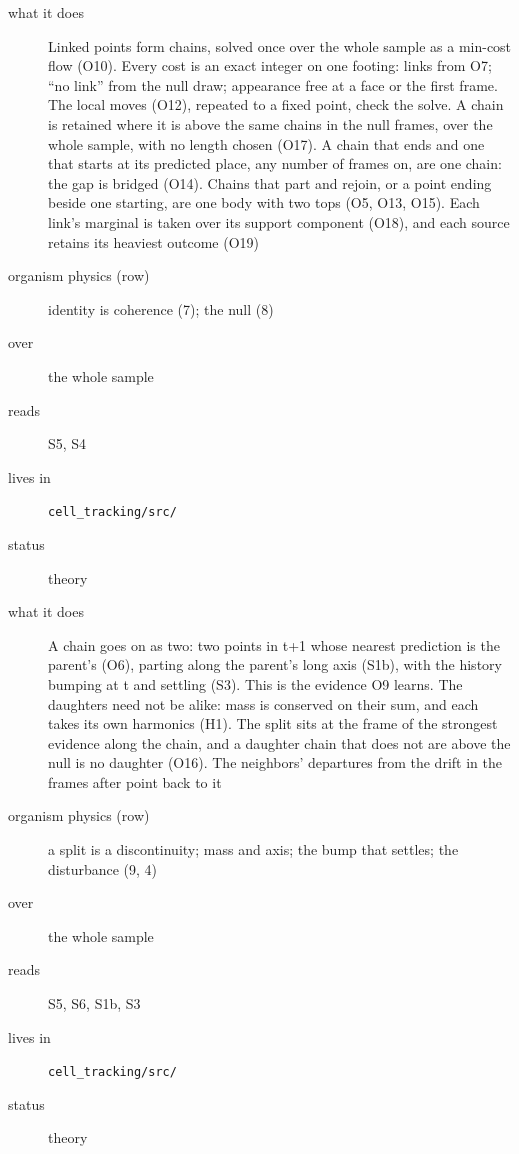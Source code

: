 \begin{description}
\item[{what it does}] Linked points form chains, solved once over the whole sample as a min-cost flow (O10). Every cost is an exact integer on one footing: links from O7; “no link” from the null draw; appearance free at a face or the first frame. The local moves (O12), repeated to a fixed point, check the solve. A chain is retained where it is above the same chains in the null frames, over the whole sample, with no length chosen (O17). A chain that ends and one that starts at its predicted place, any number of frames on, are one chain: the gap is bridged (O14). Chains that part and rejoin, or a point ending beside one starting, are one body with two tops (O5, O13, O15). Each link's marginal is taken over its support component (O18), and each source retains its heaviest outcome (O19)
\item[{organism physics (row)}] identity is coherence (7); the null (8)
\item[{over}] the whole sample
\item[{reads}] S5, S4
\item[{lives in}] \texttt{cell\_\allowbreak{}tracking/\allowbreak{}src/\allowbreak{}}
\item[{status}] theory
\end{description}

\begin{description}
\item[{what it does}] A chain goes on as two: two points in t+1 whose nearest prediction is the parent's (O6), parting along the parent's long axis (S1b), with the history bumping at t and settling (S3). This is the evidence O9 learns. The daughters need not be alike: mass is conserved on their sum, and each takes its own harmonics (H1). The split sits at the frame of the strongest evidence along the chain, and a daughter chain that does not are above the null is no daughter (O16). The neighbors' departures from the drift in the frames after point back to it
\item[{organism physics (row)}] a split is a discontinuity; mass and axis; the bump that settles; the disturbance (9, 4)
\item[{over}] the whole sample
\item[{reads}] S5, S6, S1b, S3
\item[{lives in}] \texttt{cell\_\allowbreak{}tracking/\allowbreak{}src/\allowbreak{}}
\item[{status}] theory
\end{description}

